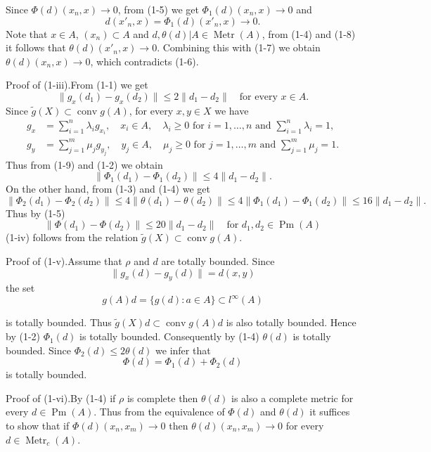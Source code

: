 \documentclass[11pt,a4paper,leqno,twoside]{article}
\newcommand{\Metr}{\operatorname{Metr}}
\newcommand{\Pm}{\operatorname{Pm}}
\newcommand{\conv}{\operatorname{conv}}
\newcommand{\norm}[1]{\lVert#1\rVert}
\newcommand{\restr}{\vert}
\newcommand{\proofpart}[1]{\par\medskip\noindent Proof of (#1).\enspace}
\begin{document}
Since $\Phi(d)(x_n,x)\to0$, from (1-5) we get $\Phi_1(d)(x_n,x)\to0$ and
\begin{equation}\tag{1-8}
d(x'_n,x)=\Phi_1(d)(x'_n,x)\to0.
\end{equation}
Note that $x\in A$, $(x_n)\subset A$ and $d,\theta(d)\restr A\in\Metr(A)$, from (1-4) and (1-8) it follows that $\theta(d)(x'_n,x)\to0$. Combining this with (1-7) we obtain $\theta(d)(x_n,x)\to0$, which contradicts (1-6).

\proofpart{1-iii}From (1-1) we get
\begin{equation}\tag{1-9}
\norm{g_x(d_1)-g_x(d_2)}\leq2\norm{d_1-d_2}\quad\text{for every }x\in A.
\end{equation}
Since $\tilde g(X)\subset\conv g(A)$, for every $x,y\in X$ we have
\[
\begin{aligned}
g_x&=\sum_{i=1}^n\lambda_i g_{x_i},\quad x_i\in A,\quad\lambda_i\geq0\text{ for }i=1,\ldots,n\text{ and }\sum_{i=1}^n\lambda_i=1,\\[5pt]
g_y&=\sum_{j=1}^m\mu_j g_{y_j},\quad y_j\in A,\quad\mu_j\geq0\text{ for }j=1,\ldots,m\text{ and }\sum_{j=1}^m\mu_j=1.
\end{aligned}
\]
Thus from (1-9) and (1-2) we obtain
\[\norm{\Phi_1(d_1)-\Phi_1(d_2)}\leq4\norm{d_1-d_2}.\]
On the other hand, from (1-3) and (1-4) we get
\[
\norm{\Phi_2(d_1)-\Phi_2(d_2)}\leq4\norm{\theta(d_1)-\theta(d_2)}\leq4\norm{\Phi_1(d_1)-\Phi_1(d_2)}\leq16\norm{d_1-d_2}.
\]
Thus by (1-5)
\[\norm{\Phi(d_1)-\Phi(d_2)}\leq20\norm{d_1-d_2}\quad\text{for }d_1,d_2\in\Pm(A)\]
(1-iv) follows from the relation $\tilde g(X)\subset\conv g(A)$.

\proofpart{1-v}Assume that $\rho$ and $d$ are totally bounded. Since
\[\norm{g_x(d)-g_y(d)}=d(x,y)\]
the set
\[g(A)d=\{g(d):a\in A\}\subset l^\infty(A)\]

\newpage %
\noindent is totally bounded. Thus $\tilde g(X)d\subset\conv g(A)d$ is also totally bounded. Hence by (1-2) $\Phi_1(d)$ is totally bounded. Consequently by (1-4) $\theta(d)$ is totally bounded. Since $\Phi_2(d)\leq2\theta(d)$ we infer that
\[\Phi(d)=\Phi_1(d)+\Phi_2(d)\]
is totally bounded.

\proofpart{1-vi}By (1-4) if $\rho$ is complete then $\theta(d)$ is also a complete metric for every $d\in\Pm(A)$. Thus from the equivalence of $\Phi(d)$ and $\theta(d)$ it suffices to show that if $\Phi(d)(x_n,x_m)\to0$ then $\theta(d)(x_n,x_m)\to0$ for every $d\in\Metr_c(A)$.
\end{document}
